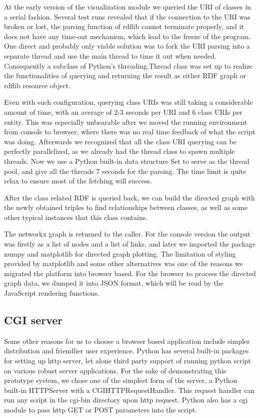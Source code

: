 \documentclass[12pt]{cls}
\begin{document}
At the early version of the visualization module we queried the URI of classes in a serial fashion. Several test runs revealed that if the connection to the URI was broken or lost, the parsing function of rdflib cannot terminate properly, and it does not have any time-out mechanism, which lead to the freeze of the program. One direct and probably only viable solution was to fork the URI parsing into a separate thread and use the main thread to time it out when needed. Consequently a subclass of Python's threading.Thread class was set up to realize the functionalities of querying and returning the result as either RDF graph or rdflib resource object.

Even with such configuration, querying class URIs was still taking a considerable amount of time, with an average of 2-3 seconds per URI and 6 class URIs per entity. This was especially unbearable after we moved the running environment from console to browser, where there was no real time feedback of what the script was doing. Afterwards we recognized that all the class URI querying can be perfectly parallelized, as we already had the thread class to spawn multiple threads. Now we use a Python built-in data structure Set to serve as the thread pool, and give all the threads 7 seconds for the parsing. The time limit is quite relax to ensure most of the fetching will success.

After the class related RDF is queried back, we can build the directed graph with the newly obtained triples to find relationships between classes, as well as some other typical instances that this class contains.

The networkx graph is returned to the caller. For the console version the output was firstly as a list of nodes and a list of links, and later we imported the package numpy and matplotlib for directed graph plotting. The limitation of styling provided by matplotlib and some other alternatives was one of the reasons we migrated the platform into browser based. For the browser to process the directed graph data, we dumped it into JSON format, which will be read by the JavaScript rendering functions.

\subsection{CGI server}

Some other reasons for us to choose a browser based application include simpler distribution and friendlier user experience. Python has several built-in packages for setting up http server, let alone third party support of running python script on various robust server applications. For the sake of demonstrating this prototype system, we chose one of the simplest form of the server, a Python built-in HTTPServer with a CGIHTTPRequestHandler. This request handler can run any script in the cgi-bin directory upon http request. Python also has a cgi module to pass http GET or POST parameters into the script.
\end{document}
